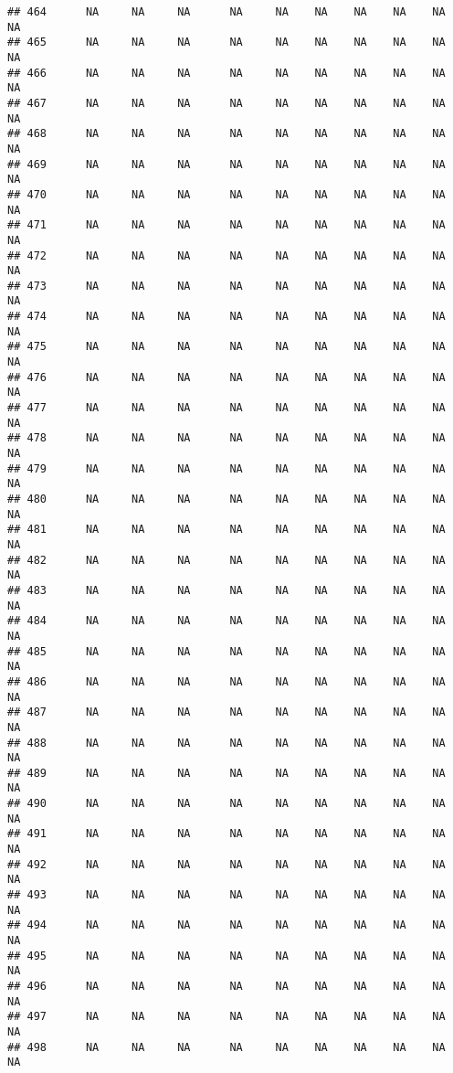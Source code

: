 \documentclass{article}\usepackage{graphicx, color}
\makeatletter
\newenvironment{kframe}{%
 \def\at@end@of@kframe{}%
 \ifinner\ifhmode%
  \def\at@end@of@kframe{\end{minipage}}%
  \begin{minipage}{\columnwidth}%
 \fi\fi%
 \def\FrameCommand##1{\hskip\@totalleftmargin \hskip-\fboxsep
 \colorbox{shadecolor}{##1}\hskip-\fboxsep
     \hskip-\linewidth \hskip-\@totalleftmargin \hskip\columnwidth}%
 \MakeFramed {\advance\hsize-\width
   \@totalleftmargin\z@ \linewidth\hsize
   \@setminipage}}%
 {\par\unskip\endMakeFramed%
 \at@end@of@kframe}
\newenvironment{knitrout}{}{} %
\makeatother
\begin{document}
\begin{knitrout}
\begin{kframe}
\begin{verbatim}
## 464      NA     NA     NA      NA     NA    NA    NA    NA    NA     NA
## 465      NA     NA     NA      NA     NA    NA    NA    NA    NA     NA
## 466      NA     NA     NA      NA     NA    NA    NA    NA    NA     NA
## 467      NA     NA     NA      NA     NA    NA    NA    NA    NA     NA
## 468      NA     NA     NA      NA     NA    NA    NA    NA    NA     NA
## 469      NA     NA     NA      NA     NA    NA    NA    NA    NA     NA
## 470      NA     NA     NA      NA     NA    NA    NA    NA    NA     NA
## 471      NA     NA     NA      NA     NA    NA    NA    NA    NA     NA
## 472      NA     NA     NA      NA     NA    NA    NA    NA    NA     NA
## 473      NA     NA     NA      NA     NA    NA    NA    NA    NA     NA
## 474      NA     NA     NA      NA     NA    NA    NA    NA    NA     NA
## 475      NA     NA     NA      NA     NA    NA    NA    NA    NA     NA
## 476      NA     NA     NA      NA     NA    NA    NA    NA    NA     NA
## 477      NA     NA     NA      NA     NA    NA    NA    NA    NA     NA
## 478      NA     NA     NA      NA     NA    NA    NA    NA    NA     NA
## 479      NA     NA     NA      NA     NA    NA    NA    NA    NA     NA
## 480      NA     NA     NA      NA     NA    NA    NA    NA    NA     NA
## 481      NA     NA     NA      NA     NA    NA    NA    NA    NA     NA
## 482      NA     NA     NA      NA     NA    NA    NA    NA    NA     NA
## 483      NA     NA     NA      NA     NA    NA    NA    NA    NA     NA
## 484      NA     NA     NA      NA     NA    NA    NA    NA    NA     NA
## 485      NA     NA     NA      NA     NA    NA    NA    NA    NA     NA
## 486      NA     NA     NA      NA     NA    NA    NA    NA    NA     NA
## 487      NA     NA     NA      NA     NA    NA    NA    NA    NA     NA
## 488      NA     NA     NA      NA     NA    NA    NA    NA    NA     NA
## 489      NA     NA     NA      NA     NA    NA    NA    NA    NA     NA
## 490      NA     NA     NA      NA     NA    NA    NA    NA    NA     NA
## 491      NA     NA     NA      NA     NA    NA    NA    NA    NA     NA
## 492      NA     NA     NA      NA     NA    NA    NA    NA    NA     NA
## 493      NA     NA     NA      NA     NA    NA    NA    NA    NA     NA
## 494      NA     NA     NA      NA     NA    NA    NA    NA    NA     NA
## 495      NA     NA     NA      NA     NA    NA    NA    NA    NA     NA
## 496      NA     NA     NA      NA     NA    NA    NA    NA    NA     NA
## 497      NA     NA     NA      NA     NA    NA    NA    NA    NA     NA
## 498      NA     NA     NA      NA     NA    NA    NA    NA    NA     NA

\end{verbatim}
\end{kframe}
\end{knitrout}
\end{document}
